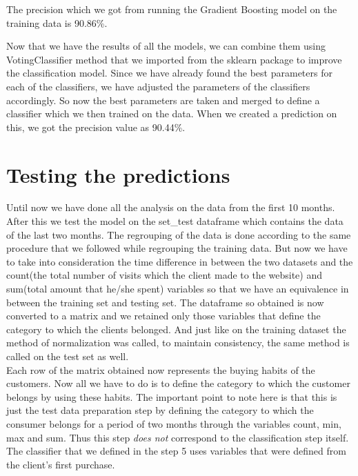 The precision which we got from running the Gradient Boosting model on the training data is 90.86\%.

Now that we have the results of all the models, we can combine them using VotingClassifier method that we imported from the sklearn package to improve the classification model. Since we have already found the best parameters for each of the classifiers, we have adjusted the parameters of the classifiers accordingly. So now the best parameters are taken and merged to define a classifier which  we then trained on the data. When we created a prediction on this, we got the precision value as 90.44\%.

\section{Testing the predictions}
Until now we have done all the analysis on the data from the first 10 months. After this we test the model on the set\_test dataframe which contains the data of the last two months. The regrouping of the data is done according to the same procedure that we followed while regrouping the training data. But now we have to take into consideration the time difference in between the two datasets and the count(the total number of visits which the client made to the website) and sum(total amount that he/she spent) variables so that we have an equivalence in between the training set and testing set. The dataframe so obtained is now converted to a matrix and we retained only those variables that define the category to which the clients belonged. And just like on the training dataset the method of normalization was called, to maintain consistency, the same method is called on the test set as well.\\
Each row of the matrix obtained now represents the buying habits of the customers. Now all we have to do is to define the category to which the customer belongs by using these habits. The important point to note here is that this is just the test data preparation step by defining the category to which the consumer belongs for a period of two months through the variables count, min, max and sum. Thus this step \emph{does not} correspond to the classification step itself. The classifier that we defined in the step 5 uses variables that were defined from the client's first purchase.\\
